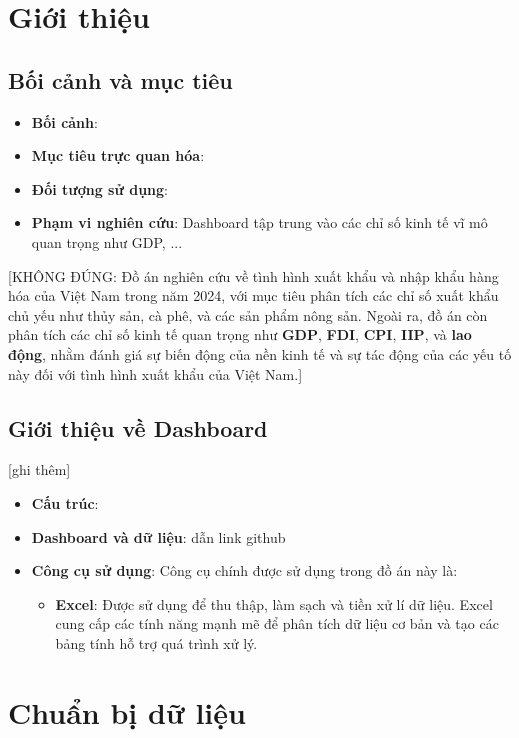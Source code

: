 \documentclass[a4paper]{report}
\begin{document}
\newpage
\section{Giới thiệu}
\subsection{Bối cảnh và mục tiêu}
{\begin{itemize}
    \item \textbf{Bối cảnh}: 
    \item \textbf{Mục tiêu trực quan hóa}:
    \item \textbf{Đối tượng sử dụng}:
    \item \textbf{Phạm vi nghiên cứu}: Dashboard tập trung vào các chỉ số kinh tế vĩ mô quan trọng như GDP, ... 
\end{itemize}
[KHÔNG ĐÚNG: Đồ án nghiên cứu về tình hình xuất khẩu và nhập khẩu hàng hóa của Việt Nam trong năm 2024, với mục tiêu phân tích các chỉ số xuất khẩu chủ yếu như thủy sản, cà phê, và các sản phẩm nông sản. Ngoài ra, đồ án còn phân tích các chỉ số kinh tế quan trọng như \textbf{GDP}, \textbf{FDI}, \textbf{CPI}, \textbf{IIP}, và \textbf{lao động}, nhằm đánh giá sự biến động của nền kinh tế và sự tác động của các yếu tố này đối với tình hình xuất khẩu của Việt Nam.]

\subsection{Giới thiệu về Dashboard}
[ghi thêm]
{\begin{itemize}
    \item \textbf{Cấu trúc}: 
    \item \textbf{Dashboard và dữ liệu}: dẫn link github
    \item \textbf{Công cụ sử dụng}: Công cụ chính được sử dụng trong đồ án này là:
        \begin{itemize}
            \item \textbf{Excel}: Được sử dụng để thu thập, làm sạch và tiền xử lí dữ liệu. Excel cung cấp các tính năng mạnh mẽ để phân tích dữ liệu cơ bản và tạo các bảng tính hỗ trợ quá trình xử lý.
        \end{itemize}
\end{itemize}

\section{Chuẩn bị dữ liệu}
}}
\end{document}
